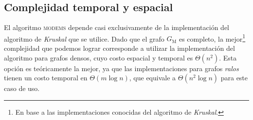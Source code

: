 \subsection{Complejidad temporal y espacial} El algoritmo \textsc{modems} depende casi exclusivamente de la implementación del algoritmo de \textit{Kruskal} que se utilice. Dado que el grafo $G_\text{M}$ es completo, la mejor\footnote{ En base a las implementaciones conocidas del algoritmo de \textit{Kruskal}.} complejidad que podemos lograr corresponde a utilizar la implementación del algoritmo para grafos densos, cuyo costo espacial y temporal es $\Theta(n^2)$. Esta opción es teóricamente la mejor, ya que las implementaciones para grafos \textit{ralos} tienen un costo temporal en $\Theta(m\log n)$, que equivale a $\Theta(n^2 \log n)$ para este caso de uso. 

